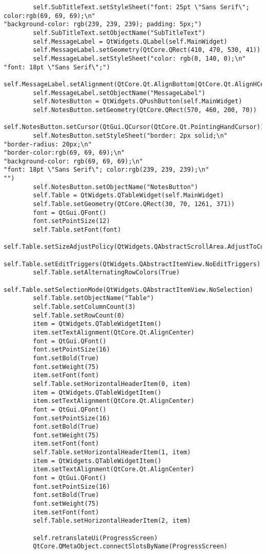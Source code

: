 \documentclass{article}
\begin{document}
\begin{lstlisting}
        self.SubTitleText.setStyleSheet("font: 25pt \"Sans Serif\"; color:rgb(69, 69, 69);\n"
"background-color: rgb(239, 239, 239); padding: 5px;")
        self.SubTitleText.setObjectName("SubTitleText")
        self.MessageLabel = QtWidgets.QLabel(self.MainWidget)
        self.MessageLabel.setGeometry(QtCore.QRect(410, 470, 530, 41))
        self.MessageLabel.setStyleSheet("color: rgb(0, 140, 0);\n"
"font: 18pt \"Sans Serif\";")
        self.MessageLabel.setAlignment(QtCore.Qt.AlignBottom|QtCore.Qt.AlignHCenter)
        self.MessageLabel.setObjectName("MessageLabel")
        self.NotesButton = QtWidgets.QPushButton(self.MainWidget)
        self.NotesButton.setGeometry(QtCore.QRect(570, 460, 200, 70))
        self.NotesButton.setCursor(QtGui.QCursor(QtCore.Qt.PointingHandCursor))
        self.NotesButton.setStyleSheet("border: 2px solid;\n"
"border-radius: 20px;\n"
"border-color:rgb(69, 69, 69);\n"
"background-color: rgb(69, 69, 69);\n"
"font: 18pt \"Sans Serif\"; color:rgb(239, 239, 239);\n"
"")
        self.NotesButton.setObjectName("NotesButton")
        self.Table = QtWidgets.QTableWidget(self.MainWidget)
        self.Table.setGeometry(QtCore.QRect(30, 70, 1261, 371))
        font = QtGui.QFont()
        font.setPointSize(12)
        self.Table.setFont(font)
        self.Table.setSizeAdjustPolicy(QtWidgets.QAbstractScrollArea.AdjustToContents)
        self.Table.setEditTriggers(QtWidgets.QAbstractItemView.NoEditTriggers)
        self.Table.setAlternatingRowColors(True)
        self.Table.setSelectionMode(QtWidgets.QAbstractItemView.NoSelection)
        self.Table.setObjectName("Table")
        self.Table.setColumnCount(3)
        self.Table.setRowCount(0)
        item = QtWidgets.QTableWidgetItem()
        item.setTextAlignment(QtCore.Qt.AlignCenter)
        font = QtGui.QFont()
        font.setPointSize(16)
        font.setBold(True)
        font.setWeight(75)
        item.setFont(font)
        self.Table.setHorizontalHeaderItem(0, item)
        item = QtWidgets.QTableWidgetItem()
        item.setTextAlignment(QtCore.Qt.AlignCenter)
        font = QtGui.QFont()
        font.setPointSize(16)
        font.setBold(True)
        font.setWeight(75)
        item.setFont(font)
        self.Table.setHorizontalHeaderItem(1, item)
        item = QtWidgets.QTableWidgetItem()
        item.setTextAlignment(QtCore.Qt.AlignCenter)
        font = QtGui.QFont()
        font.setPointSize(16)
        font.setBold(True)
        font.setWeight(75)
        item.setFont(font)
        self.Table.setHorizontalHeaderItem(2, item)

        self.retranslateUi(ProgressScreen)
        QtCore.QMetaObject.connectSlotsByName(ProgressScreen)


\end{lstlisting}
\end{document}
